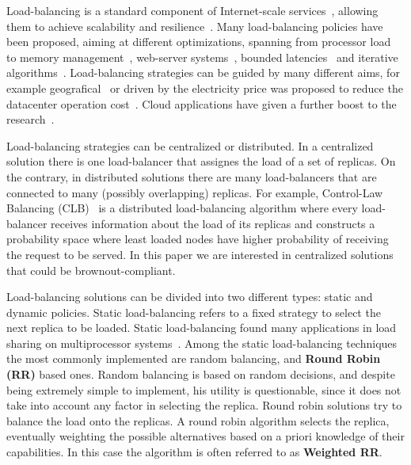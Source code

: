 Load-balancing is a standard component of Internet-scale
services~\cite{WangOSDI}, allowing them to achieve scalability and
resilience~\citep{Barroso09,Hamilton07:LISA,clusteredbalancing}. Many
load-balancing policies have been proposed, aiming at different
optimizations, spanning from processor load~\cite{Stankovic:TC} to
memory management~\cite{PattersonMemoryLB,MemoryLBACC}, web-server
systems~\cite{Cardellini2003}, bounded latencies~\cite{TC-Abdelzaher}
and iterative algorithms~\cite{BahiIterative}. Load-balancing
strategies can be guided by many different aims, for example
geografical~\cite{GeograficalSASO,geographicalwanbalancing} or driven
by the electricity price was proposed to reduce the datacenter
operation cost~\cite{LoadBalancingForElectricity:TCC}. Cloud
applications have given a further boost to the
research~\citep{Barroso09,Lu11:PerfEval,Lin12:IGCC}.

Load-balancing strategies can be centralized or distributed. In a
centralized solution there is one load-balancer that assignes the load
of a set of replicas. On the contrary, in distributed solutions there
are many load-balancers that are connected to many (possibly
overlapping) replicas. For example, Control-Law Balancing
(CLB)~\cite{CLB} is a distributed load-balancing algorithm where every
load-balancer receives information about the load of its replicas and
constructs a probability space where least loaded nodes have higher
probability of receiving the request to be served.  In this paper we
are interested in centralized solutions that could be 
brownout-compliant. 


Load-balancing solutions can be divided into two different types:
static and dynamic policies. Static load-balancing refers to a fixed
strategy to select the next replica to be loaded. Static
load-balancing found many applications in load sharing on
multiprocessor
systems~\cite{StaticLoadBalancing:TSE,StaticOptimal:ACM}. Among the
static load-balancing techniques the most commonly implemented are
random balancing, and \textbf{Round Robin (RR)} based ones. Random
balancing is based on random decisions, and despite being extremely
simple to implement, his utility is questionable, since it does not
take into account any factor in selecting the replica. Round robin
solutions try to balance the load onto the replicas. A round robin
algorithm selects the replica, eventually weighting the possible
alternatives based on a priori knowledge of their capabilities. In
this case the algorithm is often referred to as \textbf{Weighted RR}.

